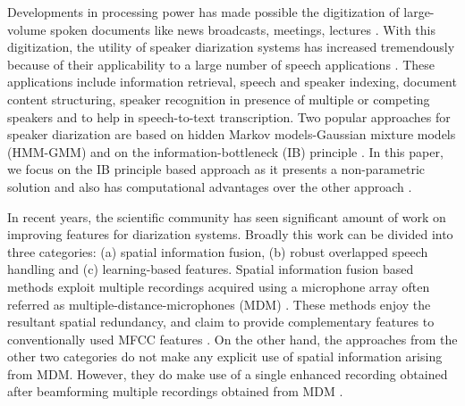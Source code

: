 \documentclass[conference]{IEEEtran}
\begin{document}
Developments in processing power has made possible the digitization of
large-volume spoken documents like news broadcasts, meetings, lectures 
\cite{reviewPaper2,reviewPaper3}. With this digitization, the utility of speaker
diarization systems has increased tremendously because of their applicability to a large 
number of speech applications \cite{reviewPaper1,reviewPaper4}. These applications 
include information retrieval, speech and speaker indexing, 
document content structuring, speaker recognition in presence of multiple or
competing speakers and to help in speech-to-text transcription. Two popular
approaches for speaker diarization are based on hidden Markov models-Gaussian
mixture models (HMM-GMM) \cite{reviewPaper1} and on
the information-bottleneck (IB) principle \cite{aIB2}. In this paper, we focus on the IB principle based approach as it presents a non-parametric solution and also has computational advantages over the
other approach \cite{aIB2}.

In recent years, the scientific community has seen significant amount of work on
improving features for diarization systems. Broadly this work can be divided
into three categories: (a) spatial information fusion, (b) 
robust overlapped speech handling and (c) learning-based features. Spatial
information fusion based methods exploit multiple recordings acquired using a microphone array often 
referred as multiple-distance-microphones (MDM) \cite{aIB3,aIB4,featAngle,speakerUPM,featSpatial,MDM}. 
These methods enjoy the resultant spatial redundancy, and claim to provide complementary features to
conventionally used MFCC features \cite{MDM}. On the other hand, the approaches from the other two categories do not make any explicit use of spatial information arising from MDM. However, they do make use of a single enhanced recording obtained after beamforming multiple recordings obtained from MDM \cite{beamforming}.
\end{document}
